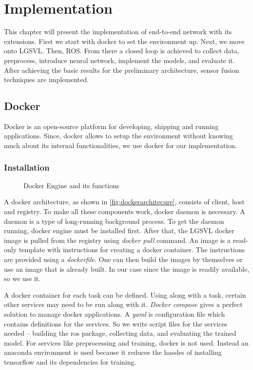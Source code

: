 \chapter{Implementation}
\label{chapter:implementation}
This chapter will present the implementation of end-to-end network with its extensions.
First we start with docker to set the environment up. Next, we move onto LGSVL. Then, ROS.
From there a closed loop is achieved to collect data, preprocess, introduce neural
network, implement the models, and evaluate it. After achieving the basic results for the
preliminary architecture, sensor fusion techniques are implemented.

\section{Docker}
Docker is an open-source platform for developing, shipping and running applications.
Since, docker allows to setup the environment without knowing much about its internal
functionalities, we use docker for our implementation.

\subsection{Installation}

\begin{figure}
	\centering
    \def\svgwidth{0.5\textwidth}
    \caption{Docker Engine and its functions}
    \label{fig:dockerengine}
\end{figure}

A docker architecture, as shown in \ref{fig:dockerarchitecure}, consists of client, host
and registry. To make all these components work, docker daemon is necessary. A daemon is a
type of long-running background process. To get the daemon running, docker engine must be
installed first. After that, the LGSVL docker image is pulled from the registry using
\textit{docker pull} command. An image is a read-only template with instructions for
creating a docker container. The instructions are provided using a \textit{dockerfile}.
One can then build the images by themselves or use an image that is already built. In our
case since the image is readily available, so we use it.

A docker container for each task can be defined. Using along with a task, certain other
services may need to be run along with it. \textit{Docker compose} gives a perfect
solution to manage docker applications. A \textit{yaml} is configuration file which contains
definitions for the services. So we write script files for the services needed --
building the ros package, collecting data, and evaluating the trained model. For
services like preprocessing and training, docker is not used. Instead an anaconda
environment \cite{anacondaenv} is used because it reduces the hassles of installing tensorflow
 and its dependencies for training.

